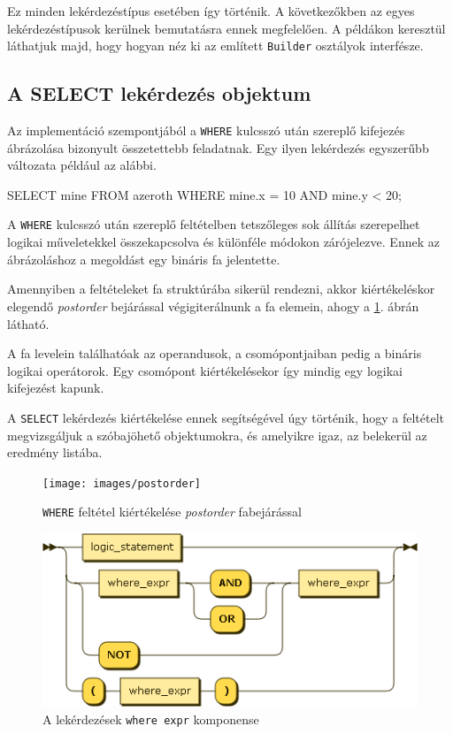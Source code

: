 Ez minden lekérdezéstípus esetében így történik. A következőkben az egyes lekérdezéstípusok kerülnek bemutatásra ennek megfelelően. A példákon keresztül láthatjuk majd, hogy hogyan néz ki az említett \texttt{Builder} osztályok interfésze.

\subsection{A SELECT lekérdezés objektum}

Az implementáció szempontjából a \texttt{WHERE} kulcsszó után szereplő kifejezés ábrázolása bizonyult összetettebb feladatnak. Egy ilyen lekérdezés egyszerűbb változata például az alábbi.
\begin{sql}
SELECT mine FROM azeroth WHERE mine.x = 10 AND mine.y < 20;
\end{sql}

A \texttt{WHERE} kulcsszó után szereplő feltételben tetszőleges sok állítás szerepelhet logikai műveletekkel összekapcsolva és különféle módokon zárójelezve. Ennek az ábrázoláshoz a megoldást egy bináris fa jelentette.

Amennyiben a feltételeket fa struktúrába sikerül rendezni, akkor kiértékeléskor elegendő \textit{postorder} bejárással végigiterálnunk a fa elemein, ahogy a \ref{fig:postorder}. ábrán látható.

A fa levelein találhatóak az operandusok, a csomópontjaiban pedig a bináris logikai operátorok. Egy csomópont kiértékelésekor így mindig egy logikai kifejezést kapunk.

A \texttt{SELECT} lekérdezés kiértékelése ennek segítségével úgy történik, hogy a feltételt megvizsgáljuk a szóbajöhető objektumokra, és amelyikre igaz, az belekerül az eredmény listába.

\begin{figure}[htb]
	\begin{center}
		\texttt{[image: images/postorder]}
		\caption{\texttt{WHERE} feltétel kiértékelése \textit{postorder} fabejárással}
		\label{fig:postorder}
	\end{center}
\end{figure}

\begin{figure}[htb]
	\begin{center}
		\includegraphics[scale=0.6]{images/where_expr}
		\caption{A lekérdezések \texttt{where expr} komponense}
		\label{fig:whereexprSytnax}
	\end{center}
\end{figure}

